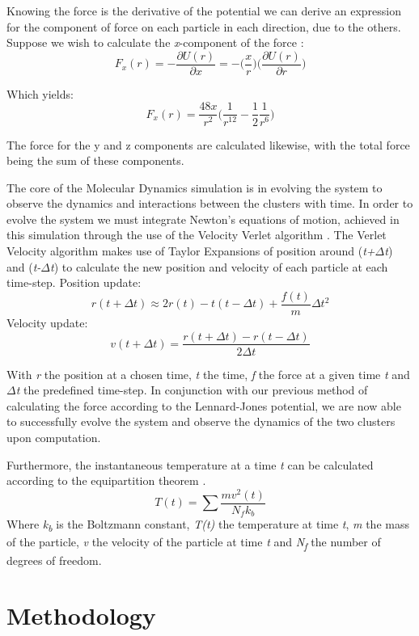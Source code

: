 \documentclass{article}
\begin{document}
\begin{multicols}{2}
 Knowing the force is the derivative of the potential we can derive an expression for the component of force on each particle in each direction, due to the others. Suppose we wish to calculate the \textit{x}-component of the force \cite{frenkel}:
 \[ F_x(r) = -\frac{\partial U(r)}{\partial{x}}
  = -\Big(\frac{x}{r}\Big) \Big(\frac{\partial U(r)}{\partial r}\Big) \]
  
  Which yields:
  \[F_x(r) = \frac{48x}{r^2} \Big(\frac{1}{r^{12}} - \frac{1}{2} \frac{1}{r^6}\Big) \]
  
  The force for the y and z components are calculated likewise, with the total force being the sum of these components. 
  
The core of the Molecular Dynamics simulation is in evolving the system to observe the dynamics and interactions between the clusters with time. In order to evolve the system we must integrate Newton's equations of motion, achieved in this simulation through the use of the Velocity Verlet algorithm \cite{frenkel}. The Verlet Velocity algorithm makes use of Taylor Expansions of position around (\textit{t+$\Delta$t}) and (\textit{t-$\Delta$t}) to calculate the new position and velocity of each particle at each time-step. \newline Position update:
\[r(t+\Delta t) \approx 2r(t) - t(t-\Delta t) + \frac{f(t)}{m}\Delta t^{2}\]
Velocity update:
\[v(t+\Delta t) = \frac{r(t+\Delta t) - r(t-\Delta t)}{2\Delta t}\]

With \textit{r} the position at a chosen time, \textit{t} the time, \textit{f} the force at a given time \textit{t} and $\Delta$\textit{t} the predefined time-step. 
\newline In conjunction with our previous method of calculating the force according to the Lennard-Jones potential, we are now able to successfully evolve the system and observe the dynamics of the two clusters upon computation.

  Furthermore, the instantaneous temperature at a time \textit{t} can be calculated according to the equipartition theorem \cite{frenkel}.
  \[T(t) = \sum \frac{mv^{2}(t)}{N_f k_b}\]
    Where \textit{k\textsubscript{b}} is the Boltzmann constant, \textit{T(t)} the temperature at time \textit{t}, \textit{m} the mass of the particle, \textit{v} the velocity of the particle at time \textit{t} and \textit{N\textsubscript{f}} the number of degrees of freedom.

\part{Methodology}


\end{multicols}
\end{document}
